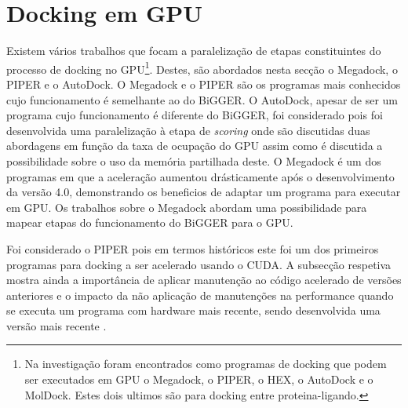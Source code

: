 
\section{Docking em GPU}
\label{gpus1}
Existem vários trabalhos que focam a paralelização de etapas constituintes do processo de docking no GPU\footnote[5]{Na investigação foram encontrados como programas de docking que podem ser executados em GPU o Megadock, o PIPER, o HEX, o AutoDock e o MolDock. Estes dois ultimos são para docking entre proteina-ligando.}. Destes, são abordados nesta secção o Megadock, o PIPER e o AutoDock. O Megadock e o PIPER são os programas mais conhecidos cujo funcionamento é semelhante ao do BiGGER. O AutoDock, apesar de ser um programa cujo funcionamento é diferente do BiGGER, foi considerado pois foi desenvolvida uma paralelização à etapa de \textit{scoring} \cite{autodockCuda} onde são discutidas duas abordagens em função da taxa de ocupação do GPU assim como é discutida a possibilidade sobre o uso da memória partilhada deste. O Megadock é um dos programas em que a aceleração aumentou drásticamente após o desenvolvimento da versão 4.0, demonstrando os beneficios de adaptar um programa para executar em GPU. Os trabalhos sobre o Megadock \cite{shimoda2015protein} \cite{megadock40} abordam uma possibilidade para mapear etapas do funcionamento do BiGGER para o GPU.\par Foi considerado o PIPER pois em termos históricos este foi um dos primeiros programas para docking a ser acelerado usando o CUDA\cite{piper2009gpu}. A subsecção respetiva mostra ainda a importância de aplicar manutenção ao código acelerado de versões anteriores e o impacto da não aplicação de manutenções na performance quando se executa um programa com hardware mais recente, sendo desenvolvida uma versão mais recente \cite{piper2014gpu}.

